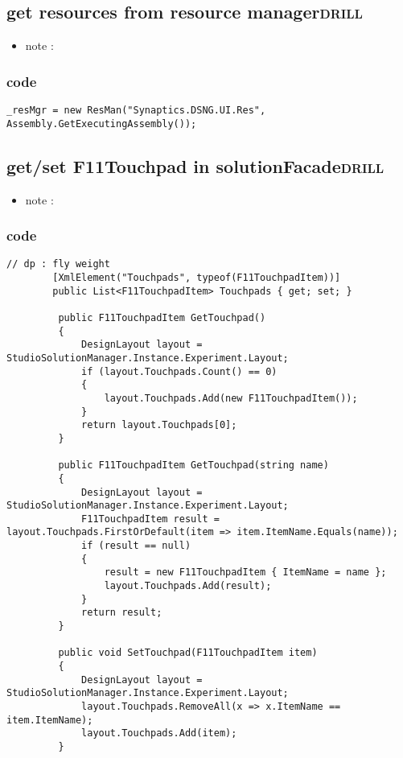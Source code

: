 \documentclass[11pt]{article}
\begin{document}
\subsection{get resources from resource manager\hfill{}\textsc{drill}}
\label{sec:orga46b606}
\begin{itemize}
\item note :
\end{itemize}
\subsubsection{code}
\label{sec:org51185a7}
\begin{verbatim}
_resMgr = new ResMan("Synaptics.DSNG.UI.Res", Assembly.GetExecutingAssembly());

\end{verbatim}

\subsection{get/set F11Touchpad in solutionFacade\hfill{}\textsc{drill}}
\label{sec:orgfe7e065}
\begin{itemize}
\item note :
\end{itemize}
\subsubsection{code}
\label{sec:orgde7d22b}
\begin{verbatim}
// dp : fly weight
        [XmlElement("Touchpads", typeof(F11TouchpadItem))]
        public List<F11TouchpadItem> Touchpads { get; set; }

         public F11TouchpadItem GetTouchpad()
         {
             DesignLayout layout = StudioSolutionManager.Instance.Experiment.Layout;
             if (layout.Touchpads.Count() == 0)
             {
                 layout.Touchpads.Add(new F11TouchpadItem());
             }
             return layout.Touchpads[0];
         }

         public F11TouchpadItem GetTouchpad(string name)
         {
             DesignLayout layout = StudioSolutionManager.Instance.Experiment.Layout;
             F11TouchpadItem result = layout.Touchpads.FirstOrDefault(item => item.ItemName.Equals(name));
             if (result == null)
             {
                 result = new F11TouchpadItem { ItemName = name };
                 layout.Touchpads.Add(result);
             }
             return result;
         }

         public void SetTouchpad(F11TouchpadItem item)
         {
             DesignLayout layout = StudioSolutionManager.Instance.Experiment.Layout;
             layout.Touchpads.RemoveAll(x => x.ItemName == item.ItemName);
             layout.Touchpads.Add(item);
         }

\end{verbatim}
\end{document}
